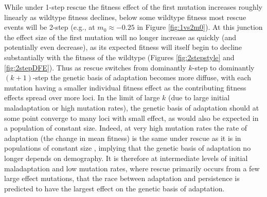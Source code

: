 \documentclass[9pt,twocolumn,twoside,lineno]{gsajnl}
\begin{document}
While under 1-step rescue the fitness effect of the first mutation increases roughly linearly as wildtype fitness declines, below some wildtype fitness most rescue events will be 2-step (e.g., at $m_0 \approx -0.25$ in Figure \ref{fig:1vs2m0}).
At this junction the effect size of the first mutation will no longer increase as quickly (and potentially even decrease), as its expected fitness will itself begin to decline substantially with the fitness of the wildtype (Figures \ref{fig:2stepstyle} and \ref{fig:2stepDFE}).
Thus as rescue switches from dominantly $k$-step to dominantly $(k+1)$-step the genetic basis of adaptation becomes more diffuse, with each mutation having a smaller individual fitness effect as the contributing fitness effects spread over more loci.
In the limit of large $k$ (due to large initial maladaptation or high mutation rates), the genetic basis of adaptation should at some point converge to many loci with small effect, as would also be expected in a population of constant size.
Indeed, at very high mutation rates the rate of adaptation (the change in mean fitness) is the same under rescue as it is in populations of constant size \citep{anciaux2019population}, implying that the genetic basis of adaptation no longer depends on demography.
It is therefore at intermediate levels of initial maladaptation and low mutation rates, where rescue primarily occurs from a few large effect mutations, that the race between adaptation and persistence is predicted to have the largest effect on the genetic basis of adaptation.
\end{document}
